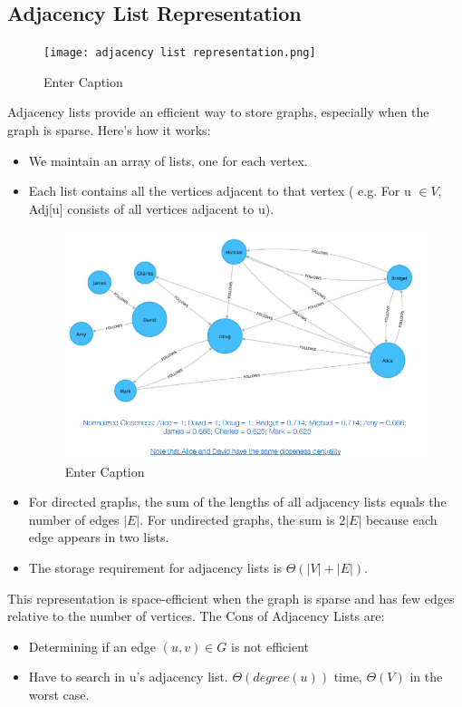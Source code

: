 \subsection{Adjacency List Representation}
\begin{figure}[h]
    \centering
    \texttt{[image: adjacency list representation.png]}
    \caption{Enter Caption}
    \label{fig:enter-label}
\end{figure}
Adjacency lists provide an efficient way to store graphs, especially when the graph is sparse. Here's how it works:
\begin{itemize}
    \item We maintain an array of lists, one for each vertex.
    \item Each list contains all the vertices adjacent to that vertex ( e.g. For u $\in V$, Adj[u] consists of all vertices adjacent to u).
    \begin{figure}
        \centering
        \includegraphics[width=0.75\linewidth]{image.png}
        \caption{Enter Caption}
        \label{fig:enter-label}
    \end{figure}
    \item For directed graphs, the sum of the lengths of all adjacency lists equals the number of edges $|E|$. For undirected graphs, the sum is $2|E|$ because each edge appears in two lists.
    \item The storage requirement for adjacency lists is $\Theta(|V| + |E|)$.
\end{itemize}
This representation is space-efficient when the graph is sparse and has few edges relative to the number of vertices. \newline
The Cons of Adjacency Lists are:
\begin{itemize}
    \item Determining if an edge $(u,v) \in G$ is not efficient
    \item Have to search in u’s adjacency list. $\Theta(degree(u))$ time, $\Theta(V)$ in the worst case.
\end{itemize}

